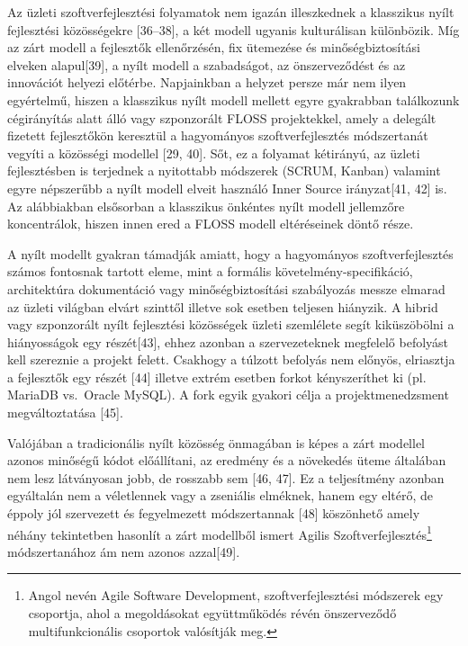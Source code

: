 \documentclass[12pt,magyar,a4paper,oneside]{scrreprt}
\begin{document}
Az üzleti szoftverfejlesztési folyamatok nem igazán illeszkednek a
klasszikus nyílt fejlesztési közösségekre {[}36--38{]}, a két modell
ugyanis kulturálisan különbözik. Míg az zárt modell a fejlesztők
ellenőrzésén, fix ütemezése és minőségbiztosítási elveken
alapul{[}39{]}, a nyílt modell a szabadságot, az önszerveződést és az
innovációt helyezi előtérbe. Napjainkban a helyzet persze már nem ilyen
egyértelmű, hiszen a klasszikus nyílt modell mellett egyre gyakrabban
találkozunk cégirányítás alatt álló vagy szponzorált FLOSS projektekkel,
amely a delegált fizetett fejlesztőkön keresztül a hagyományos
szoftverfejlesztés módszertanát vegyíti a közösségi modellel {[}29,
40{]}. Sőt, ez a folyamat kétirányú, az üzleti fejlesztésben is
terjednek a nyitottabb módszerek (SCRUM, Kanban) valamint egyre
népszerűbb a nyílt modell elveit használó Inner Source irányzat{[}41,
42{]} is. Az alábbiakban elsősorban a klasszikus önkéntes nyílt modell
jellemzőre koncentrálok, hiszen innen ered a FLOSS modell eltéréseinek
döntő része.

A nyílt modellt gyakran támadják amiatt, hogy a hagyományos
szoftverfejlesztés számos fontosnak tartott eleme, mint a formális
követelmény-specifikáció, architektúra dokumentáció vagy
minőségbiztosítási szabályozás messze elmarad az üzleti világban elvárt
szinttől illetve sok esetben teljesen hiányzik. A hibrid vagy
szponzorált nyílt fejlesztési közösségek üzleti szemlélete segít
kiküszöbölni a hiányosságok egy részét{[}43{]}, ehhez azonban a
szervezeteknek megfelelő befolyást kell szereznie a projekt felett.
Csakhogy a túlzott befolyás nem előnyös, elriasztja a fejlesztők egy
részét {[}44{]} illetve extrém esetben forkot kényszeríthet ki (pl.
MariaDB vs.~Oracle MySQL). A fork egyik gyakori célja a
projektmenedzsment megváltoztatása {[}45{]}.

Valójában a tradicionális nyílt közösség önmagában is képes a zárt
modellel azonos minőségű kódot előállítani, az eredmény és a növekedés
üteme általában nem lesz látványosan jobb, de rosszabb sem {[}46, 47{]}.
Ez a teljesítmény azonban egyáltalán nem a véletlennek vagy a zseniális
elméknek, hanem egy eltérő, de éppoly jól szervezett és fegyelmezett
módszertannak {[}48{]} köszönhető amely néhány tekintetben hasonlít a
zárt modellből ismert Agilis Szoftverfejlesztés\footnote{Angol nevén
  Agile Software Development, szoftverfejlesztési módszerek egy
  csoportja, ahol a megoldásokat együttműködés révén önszerveződő
  multifunkcionális csoportok valósítják meg.} módszertanához ám nem
azonos azzal{[}49{]}.
\end{document}
